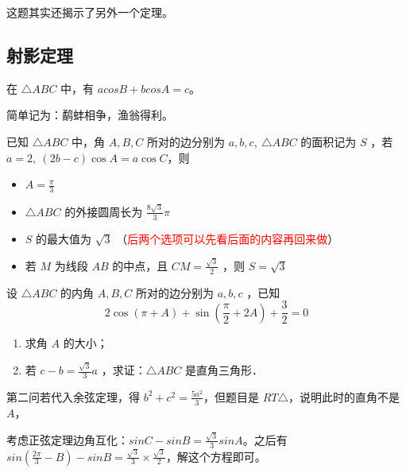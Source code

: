 \begin{tips}
    这题其实还揭示了另外一个定理。
\end{tips}

\subsection{射影定理}
\begin{theorem}[射影定理]
    在 $\triangle ABC$ 中，有 $a cosB + b cosA = c$。

    简单记为：鹬蚌相争，渔翁得利。
\end{theorem}

\begin{problem}
已知 $\triangle A B C$ 中，角 $A, B, C$ 所对的边分别为 $a, b, c, ~ \triangle A B C$ 的面积记为 $S$ ，若 $a=2, ~(2 b-c) \cos A=a \cos C$，则
\begin{itemize}
    \item $A=\frac{\pi}{3}$
    \item $\triangle A B C$ 的外接圆周长为 $\frac{8 \sqrt{3}}{3} \pi$
    \item $S$ 的最大值为 $\sqrt{3}$ （\textcolor{red}{后两个选项可以先看后面的内容再回来做}）
    \item 若 $M$ 为线段 $A B$ 的中点，且 $C M=\frac{\sqrt{3}}{2}$ ，则 $S=\sqrt{3}$
\end{itemize}
\end{problem}

\vspace{4em}

\begin{example}
    设 $\triangle A B C$ 的内角 $A, B, C$ 所对的边分别为 $a, b, c$ ，已知
    $$
        2 \cos (\pi+A)+\sin \left(\frac{\pi}{2}+2 A\right)+\frac{3}{2}=0
    $$
    \begin{enumerate}
        \item 求角 $A$ 的大小；
        \item 若 $c-b=\frac{\sqrt{3}}{3} a$ ，求证：$\triangle A B C$ 是直角三角形．
    \end{enumerate}
\end{example}

\begin{solution}
    \begin{tips}
        第二问若代入余弦定理，得 $b^2 + c^2 = \frac{5a^2}{3}$，但题目是 $RT \triangle$，说明此时的直角不是 $A$，
    \end{tips}

    考虑正弦定理边角互化：$sinC-sinB=\frac{\sqrt{3}}{3}sinA$。之后有 $sin(\frac{2\pi}{3}-B) - sinB = \frac{\sqrt{3}}{3} \times \frac{\sqrt{3}}{2}$，解这个方程即可。
\end{solution}

